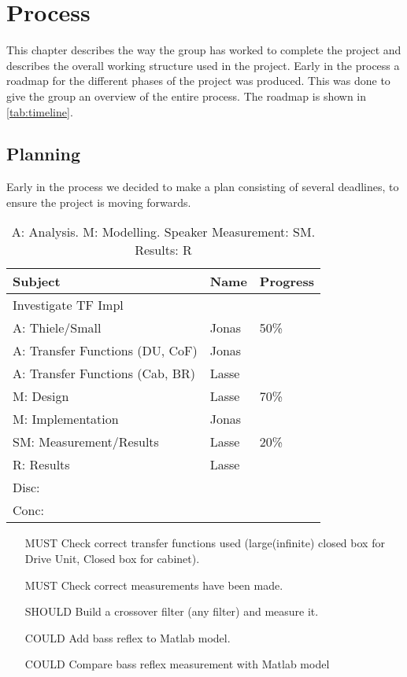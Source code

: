 
\chapter{Process}
This chapter describes the way the group has worked to complete the project and describes the overall working structure used in the project.
Early in the process a roadmap for the different phases of the project was produced. This was done to give the group an overview of the entire process. The roadmap is shown in \cref{tab:timeline}.

\section{Planning}
Early in the process we decided to make a plan consisting of several deadlines, to ensure the project is moving forwards.

\begin{table}
	\begin{tabularx}{\textwidth}{l X X}
		\toprule
		\textbf{Subject} & \textbf{Name} & \textbf{Progress} \\
		\midrule
		Investigate TF Impl & & \\
		A: Thiele/Small & Jonas & 50\% \\
		A: Transfer Functions (DU, CoF) & Jonas & \\
		A: Transfer Functions (Cab, BR) & Lasse & \\
		M: Design & Lasse & 70\% \\
		M: Implementation & Jonas & \\
		SM: Measurement/Results & Lasse & 20\% \\
		R: Results & Lasse & \\
		Disc: & & \\
		Conc: & & \\
		\bottomrule
	\end{tabularx}
	\caption{A: Analysis. M: Modelling. Speaker Measurement: SM. Results: R}
\end{table}

\begin{itemize}
	\item[MUST] Check correct transfer functions used (large(infinite) closed box for Drive Unit, Closed box for cabinet).
	\item[MUST] Check correct measurements have been made.
	\item[SHOULD] Build a crossover filter (any filter) and measure it.
	\item[COULD] Add bass reflex to Matlab model.
	\item[COULD] Compare bass reflex measurement with Matlab model
\end{itemize}